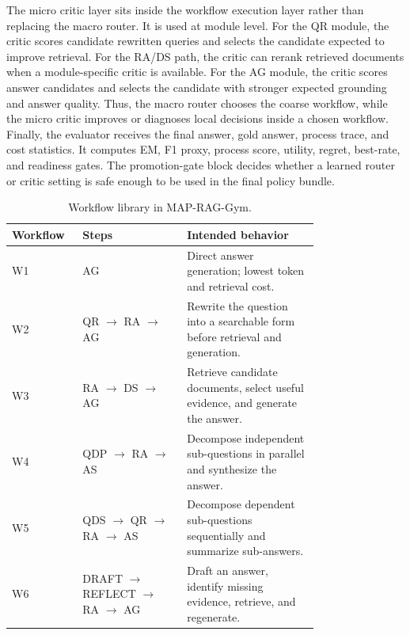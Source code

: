 \documentclass[12pt,a4paper]{article}
\begin{document}
The micro critic layer sits inside the workflow execution layer rather than replacing the macro router. It is used at module level. For the QR module, the critic scores candidate rewritten queries and selects the candidate expected to improve retrieval. For the RA/DS path, the critic can rerank retrieved documents when a module-specific critic is available. For the AG module, the critic scores answer candidates and selects the candidate with stronger expected grounding and answer quality. Thus, the macro router chooses the coarse workflow, while the micro critic improves or diagnoses local decisions inside a chosen workflow. Finally, the evaluator receives the final answer, gold answer, process trace, and cost statistics. It computes EM, F1 proxy, process score, utility, regret, best-rate, and readiness gates. The promotion-gate block decides whether a learned router or critic setting is safe enough to be used in the final policy bundle.

\begin{table}[H]
\centering
\caption{Workflow library in MAP-RAG-Gym.}
\label{tab:workflow_library}
\begin{tabular}{lp{0.34\linewidth}p{0.43\linewidth}}
\toprule
\textbf{Workflow} & \textbf{Steps} & \textbf{Intended behavior} \\
\midrule
W1 & AG & Direct answer generation; lowest token and retrieval cost. \\
W2 & QR $\rightarrow$ RA $\rightarrow$ AG & Rewrite the question into a searchable form before retrieval and generation. \\
W3 & RA $\rightarrow$ DS $\rightarrow$ AG & Retrieve candidate documents, select useful evidence, and generate the answer. \\
W4 & QDP $\rightarrow$ RA $\rightarrow$ AS & Decompose independent sub-questions in parallel and synthesize the answer. \\
W5 & QDS $\rightarrow$ QR $\rightarrow$ RA $\rightarrow$ AS & Decompose dependent sub-questions sequentially and summarize sub-answers. \\
W6 & DRAFT $\rightarrow$ REFLECT $\rightarrow$ RA $\rightarrow$ AG & Draft an answer, identify missing evidence, retrieve, and regenerate. \\
\bottomrule
\end{tabular}
\end{table}
\end{document}
